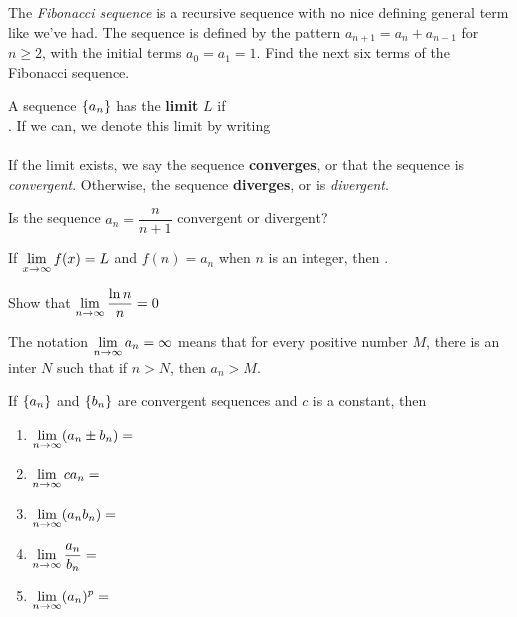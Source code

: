 \documentclass[notes]{subfiles}
\begin{document}
		\begin{ex}
			The \emph{Fibonacci sequence} is a recursive sequence with no nice defining general term like we've had.  The sequence is defined by the pattern $a_{n+1} = a_n + a_{n-1}$ for $n\geq 2$, with the initial terms $a_0 = a_1 = 1$.  Find the next six terms of the Fibonacci sequence.
		\end{ex}
			
		\begin{defn}
			A sequence $\left\lbrace a_n \right\rbrace$ has the \textbf{limit} $L$ if \\[20pt] .  If we can, we denote this limit by writing\\[10pt]
				\[\]
				\\
			If the limit exists, we say the sequence \textbf{converges}, or that the sequence is \emph{convergent}.  Otherwise, the sequence \textbf{diverges}, or is \emph{divergent}.
		\end{defn}
		
		\begin{ex}
			Is the sequence $a_n = \dfrac{n}{n+1}$ convergent or divergent?
		\end{ex}
			\newpage
			
		\begin{thm}
			If $\displaystyle \lim_{x\to \infty} f(x)  = L$ and $f(n) = a_n$ when $n$ is an integer, then .
		\end{thm}
		
		\begin{ex}
			Show that $\displaystyle \lim_{n\to \infty} \dfrac{\ln n}{n} = 0$
		\end{ex}
			
		\begin{rmk}
			The notation $\displaystyle \lim_{n\to \infty} a_n = \infty$ means that for every positive number $M$, there is an inter $N$ such that if $n > N$, then $a_n > M$.
		\end{rmk}
		
		\begin{rmk}
			If $\left\lbrace a_n \right\rbrace$ and $\left\lbrace b_n \right\rbrace$ are convergent sequences and $c$ is a constant, then\\[15pt]
			\begin{enumerate}[(1)]
				\setlength \itemsep{20pt}
				
				\item $\displaystyle \lim_{n\to\infty} (a_n \pm b_n) =$
				\item $\displaystyle \lim_{n\to\infty} ca_n = $
				\item $\displaystyle \lim_{n\to\infty} (a_nb_n) = $
				\item $\displaystyle \lim_{n\to\infty} \dfrac{a_n}{b_n} = $
				\item $\displaystyle \lim_{n\to\infty} (a_n)^p = $
			\end{enumerate}
		\end{rmk}
		\newpage
		
\end{document}
